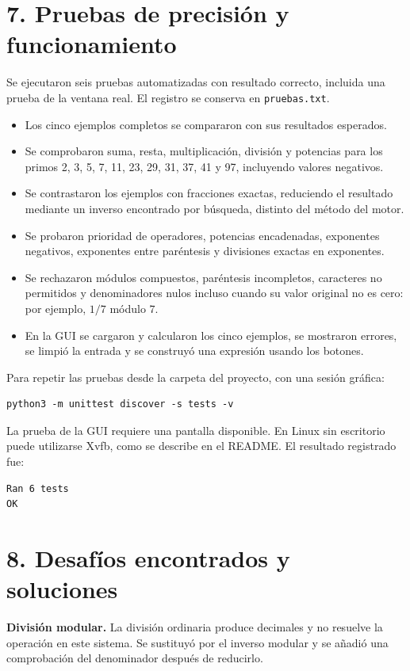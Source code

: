 \documentclass[11pt,a4paper]{article}
\begin{document}
\newpage
\section*{7. Pruebas de precisión y funcionamiento}
Se ejecutaron seis pruebas automatizadas con resultado correcto, incluida una
prueba de la ventana real. El registro se conserva en \texttt{pruebas.txt}.
\begin{itemize}
\item Los cinco ejemplos completos se compararon con sus resultados esperados.
\item Se comprobaron suma, resta, multiplicación, división y potencias para
los primos 2, 3, 5, 7, 11, 23, 29, 31, 37, 41 y 97, incluyendo valores negativos.
\item Se contrastaron los ejemplos con fracciones exactas, reduciendo el
resultado mediante un inverso encontrado por búsqueda, distinto del método del motor.
\item Se probaron prioridad de operadores, potencias encadenadas,
exponentes negativos, exponentes entre paréntesis y divisiones exactas en exponentes.
\item Se rechazaron módulos compuestos, paréntesis incompletos, caracteres
no permitidos y denominadores nulos incluso cuando su valor original no es cero:
por ejemplo, $1/7$ módulo $7$.
\item En la GUI se cargaron y calcularon los cinco ejemplos, se mostraron
errores, se limpió la entrada y se construyó una expresión usando los botones.
\end{itemize}
Para repetir las pruebas desde la carpeta del proyecto, con una sesión gráfica:
\begin{verbatim}
python3 -m unittest discover -s tests -v
\end{verbatim}
La prueba de la GUI requiere una pantalla disponible. En Linux sin escritorio
puede utilizarse Xvfb, como se describe en el README. El resultado registrado fue:
\begin{verbatim}
Ran 6 tests
OK
\end{verbatim}

\section*{8. Desafíos encontrados y soluciones}
\textbf{División modular.} La división ordinaria produce decimales y no
resuelve la operación en este sistema. Se sustituyó por el inverso modular
y se añadió una comprobación del denominador después de reducirlo.
\end{document}
